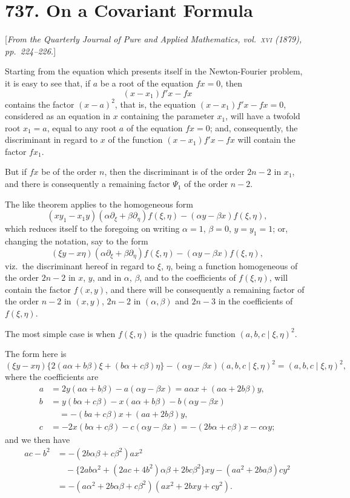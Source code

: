 \documentclass[12pt,a4paper]{article}
\theoremstyle{plain}
\begin{document}
\section*{737. On a Covariant Formula}

[\textit{From the Quarterly Journal of Pure and Applied Mathematics, vol.~\textsc{xvi} (1879),
pp.~224--226.}]

Starting from the equation which presents itself in the Newton-Fourier
problem, it is easy to see that, if $a$ be a root of the equation $fx=0$, then
\[
(x-x_1)f'x - fx
\]
contains the factor $(x-a)^2$, that is, the equation $(x-x_1)f'x-fx=0$,
considered as an equation in $x$ containing the parameter $x_1$, will have a
twofold root $x_1=a$, equal to any root $a$ of the equation $fx=0$; and,
consequently, the discriminant in regard to $x$ of the function
$(x-x_1)f'x-fx$ will contain the factor $fx_1$.

But if $fx$ be of the order $n$, then the discriminant is of the order
$2n-2$ in $x_1$, and there is consequently a remaining factor $\Psi_1$ of the
order $n-2$.

The like theorem applies to the homogeneous form
\[
(xy_1-x_1y)(\alpha\partial_\xi+\beta\partial_\eta)f(\xi,\eta)
-(\alpha y-\beta x)f(\xi,\eta),
\]
which reduces itself to the foregoing on writing $\alpha=1$, $\beta=0$, $y=y_1=1$;
or, changing the notation, say to the form
\[
(\xi y - x\eta)(\alpha\partial_\xi + \beta\partial_\eta)f(\xi,\eta)
-(\alpha y - \beta x)f(\xi,\eta),
\]
viz.~the discriminant hereof in regard to $\xi$, $\eta$, being a function homogeneous
of the order $2n-2$ in $x$, $y$, and in $\alpha$, $\beta$, and to the coefficients
of $f(\xi,\eta)$, will contain the factor $f(x,y)$, and there will be consequently
a remaining factor of the order $n-2$ in $(x,y)$, $2n-2$ in $(\alpha,\beta)$
and $2n-3$ in the coefficients of $f(\xi,\eta)$.

The most simple case is when $f(\xi,\eta)$ is the quadric function
$(a,b,c\mid\xi,\eta)^2$.

The form here is
\[
(\xi y - x\eta)\{2(a\alpha+b\beta)\xi+(b\alpha+c\beta)\eta\}
-(\alpha y-\beta x)(a,b,c\mid\xi,\eta)^2
= (a,b,c\mid\xi,\eta)^2,
\]
where the coefficients are
\begin{align*}
a &= 2y(a\alpha+b\beta)-a(\alpha y-\beta x)
= a\alpha x + (a\alpha+2b\beta)y,\\
b &= y(b\alpha+c\beta)-x(a\alpha+b\beta)-b(\alpha y-\beta x)\\
&\quad = -(ba+c\beta)x+(aa+2b\beta)y,\\
c &= -2x(b\alpha+c\beta)-c(\alpha y-\beta x)
= -(2b\alpha+c\beta)x-c\alpha y;
\end{align*}
and we then have
\begin{align*}
ac-b^2 &= -(2b\alpha\beta+c\beta^2)ax^2\\
&\quad -\{2ab\alpha^2+(2ac+4b^2)\alpha\beta+2bc\beta^2\}xy
- (aa^2+2ba\beta)cy^2\\
&= -(a\alpha^2+2b\alpha\beta+c\beta^2)(ax^2+2bxy+cy^2).
\end{align*}
\end{document}
